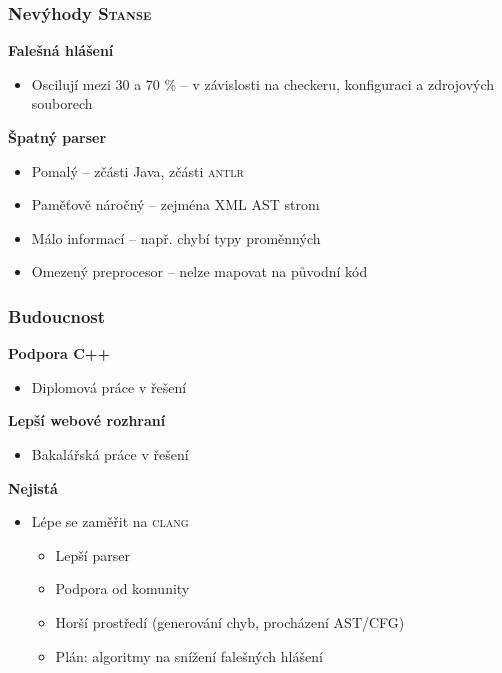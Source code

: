 \documentclass[handout,xcolor=dvipsnames]{beamer}
\newcommand{\heading}[1]{\textbf{\textcolor{BurntOrange}{#1}}}
\begin{document}
\begin{frame}
  \frametitle{Nevýhody \textsc{Stanse}}

  \heading{Falešná hlášení}
  \begin{itemize}
  \item Oscilují mezi 30 a 70 \% -- v závislosti na checkeru, konfiguraci a
  zdrojových souborech
  \end{itemize}

  \medskip
  \pause

  \heading{Špatný parser}
  \begin{itemize}
  \item Pomalý -- zčásti Java, zčásti \textsc{antlr}
  \item Paměťově náročný -- zejména XML AST strom
  \item Málo informací -- např. chybí typy proměnných
  \item Omezený preprocesor -- nelze mapovat na původní kód
  \end{itemize}

\end{frame}

\begin{frame}
  \frametitle{Budoucnost}

  \heading{Podpora C++}
  \begin{itemize}
  \item Diplomová práce v řešení
  \end{itemize}

  \medskip
  \pause

  \heading{Lepší webové rozhraní}
  \begin{itemize}
  \item Bakalářská práce v řešení
  \end{itemize}

  \medskip
  \pause

  \heading{Nejistá}
  \begin{itemize}
  \item Lépe se zaměřit na \textsc{clang}
  \begin{itemize}
  \item Lepší parser
  \item Podpora od komunity
  \item Horší prostředí (generování chyb, procházení AST/CFG)
  \item Plán: algoritmy na snížení falešných hlášení
  \end{itemize}
  \end{itemize}

\end{frame}
\end{document}
